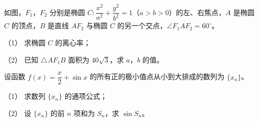 \begin{question}
如图，$F_1$，$F_2$ 分别是椭圆 $C:\dfrac{x^2}{a^2}+\dfrac{y^2}{b^2}=1$（$a>b>0$）的左、右焦点，$A$ 是椭圆 $C$ 的顶点，$B$ 是直线 $AF_2$ 与椭圆 $C$ 的另一个交点，$\angle F_1AF_2=60^\circ$。

（1） 求椭圆 $C$ 的离心率；

（2） 已知 $\triangle AF_1B$ 面积为 $40\sqrt3$，求 $a$，$b$ 的值。
\nopagebreak[4]
\begin{center}\end{center}
\nopagebreak[4]
\end{question}
\begin{question}
设函数 $f(x)=\dfrac x2+\sin x$ 的所有正的极小值点从小到大排成的数列为 $\{x_n\}$。

（1） 求数列 $\{x_n\}$ 的通项公式；

（2） 设 $\{x_n\}$ 的前 $n$ 项和为 $S_n$，求 $\sin S_n$。

\end{question}
